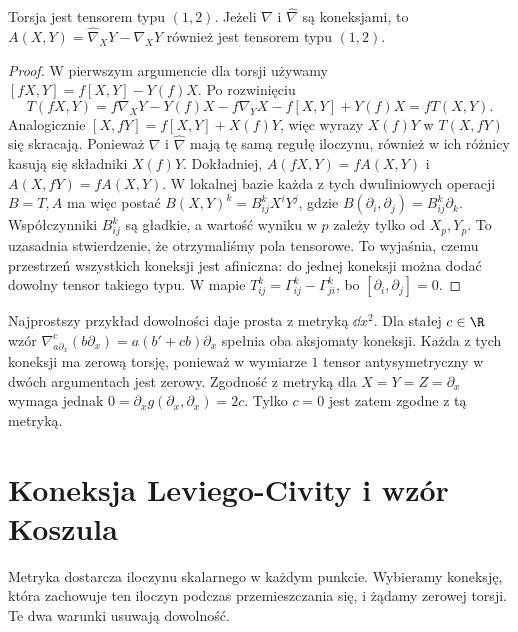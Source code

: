 \begin{stwierdzenie}
\label{prop:torsja-tensor-roznica}
Torsja jest tensorem typu $(1,2)$. Jeżeli
$\nabla$ i $\widehat\nabla$ są koneksjami,
to $A(X,Y)=\widehat\nabla_XY-\nabla_XY$
również jest tensorem typu $(1,2)$.
\end{stwierdzenie}
\begin{proof}
W pierwszym argumencie dla torsji używamy
$[fX,Y]=f[X,Y]-Y(f)X$. Po rozwinięciu
\[
 T(fX,Y)=f\nabla_XY-Y(f)X-f\nabla_YX
          -f[X,Y]+Y(f)X=fT(X,Y).
\]
Analogicznie $[X,fY]=f[X,Y]+X(f)Y$,
więc wyrazy $X(f)Y$ w $T(X,fY)$ się skracają.
Ponieważ $\nabla$ i $\widehat\nabla$ mają tę
samą regułę iloczynu, również w ich różnicy
kasują się składniki $X(f)Y$.
Dokładniej,
$A(fX,Y)=fA(X,Y)$ i $A(X,fY)=fA(X,Y)$.
W lokalnej bazie każda z tych dwuliniowych operacji
$B=T,A$ ma więc postać
$B(X,Y)^k=B^k_{ij}X^iY^j$, gdzie
$B(\partial_i,\partial_j)=B^k_{ij}\partial_k$.
Współczynniki $B^k_{ij}$ są gładkie, a wartość wyniku
w $p$ zależy tylko od $X_p,Y_p$. To uzasadnia
stwierdzenie, że otrzymaliśmy pola tensorowe.
To wyjaśnia, czemu przestrzeń wszystkich koneksji
jest afiniczna: do jednej koneksji można dodać
dowolny tensor takiego typu. W mapie
$T^k_{ij}=\Gamma^k_{ij}-\Gamma^k_{ji}$,
bo $[\partial_i,\partial_j]=0$.
\end{proof}

Najprostszy przykład dowolności daje prosta z metryką $\dd x^2$.
Dla stałej $c\in\R$ wzór
$\nabla^c_{a\partial_x}(b\partial_x)=a(b'+cb)\partial_x$
spełnia oba aksjomaty koneksji.
Każda z tych koneksji ma zerową torsję, ponieważ w wymiarze
$1$ tensor antysymetryczny w dwóch argumentach jest zerowy.
Zgodność z metryką dla $X=Y=Z=\partial_x$ wymaga jednak
$0=\partial_x g(\partial_x,\partial_x)=2c$.
Tylko $c=0$ jest zatem zgodne z tą metryką.

\section{Koneksja Leviego-Civity i wzór Koszula}
\label{sec:levi-civita-koszul}

Metryka dostarcza iloczynu skalarnego w każdym
punkcie. Wybieramy koneksję, która zachowuje ten
iloczyn podczas przemieszczania się, i żądamy
zerowej torsji. Te dwa warunki usuwają dowolność.

